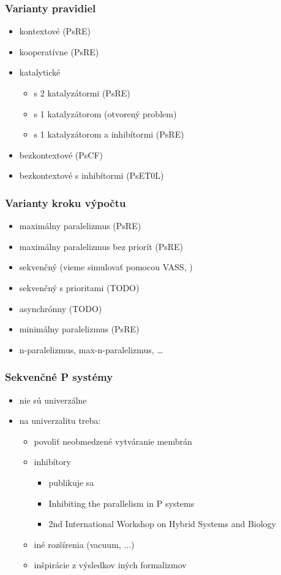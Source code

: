 \documentclass{beamer}
\begin{document}
\begin{frame}[t]\frametitle{Varianty pravidiel}
\begin{itemize}
  \item kontextové (PsRE)
  \item kooperatívne (PsRE)
  \item katalytické
  \begin{itemize}
    \item s 2 katalyzátormi (PsRE) \cite{Freund2005TwoCatalysts}
    \item s 1 katalyzátorom (otvorený problem)
    \item s 1 katalyzátorom a inhibítormi (PsRE) \cite{Ionescu:jucs_10_5:on_p_systems_with}
  \end{itemize}
  \item bezkontextové (PsCF) \cite{Sburlan05dragos}
  \item bezkontextové s inhibítormi (PsET0L) \cite{Ionescu:jucs_10_5:on_p_systems_with}
\end{itemize}
\end{frame}

\begin{frame}[t]\frametitle{Varianty kroku výpočtu}
\begin{itemize}
  \item maximálny paralelizmus (PsRE)
  \item maximálny paralelizmus bez priorít (PsRE) \cite{Sosik:2002:WithoutPriorities}
  \item sekvenčný (vieme simulovať pomocou VASS, \cite{Dang:2005:Sequential})
  \item sekvenčný s prioritami (TODO)
  \item asynchrónny (TODO)
  \item minimálny paralelizmus (PsRE) \cite{Ciobanu:2007:MinimalParallelism}
  \item n-paralelizmus, max-n-paralelizmus, \dots
\end{itemize}
\end{frame}

\begin{frame}[t]\frametitle{Sekvenčné P systémy}
\begin{itemize}
  \item nie sú univerzálne
  \item na univerzalitu treba:
  \begin{itemize}
    \item povoliť neobmedzené vytváranie membrán \cite{Dang:2005:Sequential}
    \item inhibítory
      \begin{itemize}
        \item publikuje sa
        \item Inhibiting the parallelism in P systems
        \item 2nd International Workshop on Hybrid Systems and Biology
      \end{itemize}
    \item iné rozšírenia (vacuum, ...)
    \item inšpirácie z výsledkov iných formalizmov
  \end{itemize}
\end{itemize}
\end{frame}
\end{document}
